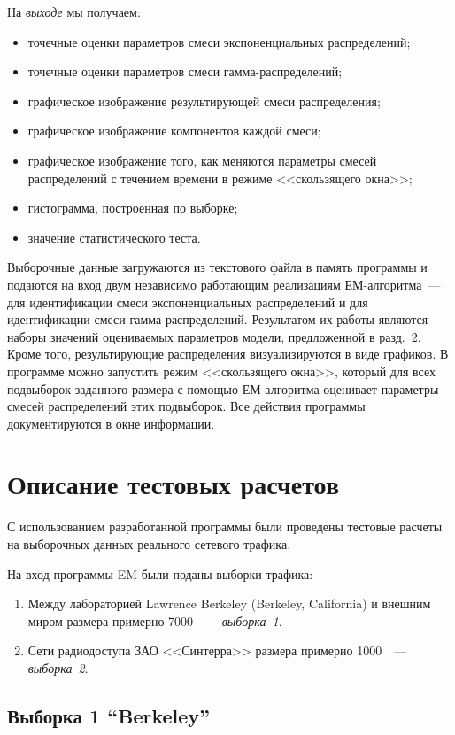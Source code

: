 \begin{multicols}{2}
На \textit{выходе} мы получаем:
\begin{itemize}
\item точечные оценки параметров смеси экспоненциальных
распределений;
\item точечные оценки параметров смеси гамма-распределений;
\item графическое изображение результирующей смеси распределения;
\item графическое изображение компонентов каж\-дой смеси;
\item графическое изображение того, как меняются параметры смесей
распределений с течением времени в режиме <<скользящего окна>>;
\item гистограмма, построенная по выборке;
\item значение статистического теста.
\end{itemize}

Выборочные данные загружаются из текстового файла в память программы и подаются
на вход двум независимо работающим реализациям ЕМ-алгоритма~--- для
идентификации смеси экспоненциальных распределений и для идентификации смеси
гамма-распределений. Результатом их работы являются наборы значений оцениваемых
параметров модели, предложенной в разд.~2. Кроме того, результирующие
распределения визуализируются в виде графиков. В программе можно запустить
режим <<скользящего окна>>, который для всех подвыборок заданного
размера с помощью ЕМ-алгоритма оценивает параметры смесей распределений этих
подвыборок. Все действия программы документируются в окне информации.

\section{Описание тестовых расчетов}

С использованием разработанной программы были проведены тестовые
расчеты на выборочных данных реального сетевого трафика.

На вход программы EM были поданы выборки трафика:
\begin{enumerate}[I]
\item Между лабораторией Lawrence Berkeley (Berkeley, California) и
внешним миром размера примерно 7000~\cite{8bat}~--- \textit{выборка~1}.
\item
Сети радиодоступа ЗАО <<Синтерра>> размера примерно 1000~\cite{9bat}~---
 \textit{выборка~2}.
\end{enumerate}

\subsection{Выборка 1 ``Berkeley''} %


\end{multicols}
